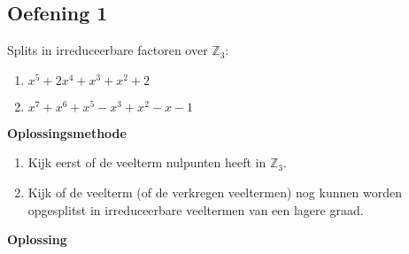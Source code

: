\documentclass[11pt,a4paper,titlepage]{article}
\begin{document}
\subsection{Oefening 1}
Splits in irreduceerbare factoren over $\mathbb{Z}_3$:
\begin{enumerate}[label=(\alph*)]	
	\item $x^5+2x^4+x^3+x^2+2$
	\item $x^7+x^6+x^5-x^3+x^2-x-1$
\end{enumerate}
\textbf{Oplossingsmethode}
\begin{enumerate}
	\item Kijk eerst of de veelterm nulpunten heeft in $\mathbb{Z}_3$.
	\item Kijk of de veelterm (of de verkregen veeltermen) nog kunnen worden opgesplitst in irreduceerbare veeltermen van een lagere graad.
\end{enumerate}
\textbf{Oplossing}
\end{document}
